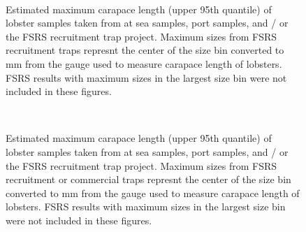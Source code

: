 \documentclass[11pt]{article}
\newcommand{\D}{.}
\newcommand{\e}{/backup/bio_data/bio.lobster/figures/} %
\begin{document}
\begin{landscape}
\begin{figure}
        \centering
         \\
                    
                    \caption{Estimated maximum carapace length (upper 95th quantile) of lobster samples taken from at sea samples, port samples, and / or the FSRS recruitment trap project. Maximum sizes from FSRS recruitment traps represnt the center of the size bin converted to mm from the gauge used to measure carapace length of lobsters. FSRS results with maximum sizes in the largest size bin were not included in these figures.}
        \end{figure}

\begin{figure}
        \centering
         \\
                    
                    \caption{Estimated maximum carapace length (upper 95th quantile) of lobster samples taken from at sea samples, port samples, and / or the FSRS recruitment trap project. Maximum sizes from FSRS recruitment or commercial traps represnt the center of the size bin converted to mm from the gauge used to measure carapace length of lobsters. FSRS results with maximum sizes in the largest size bin were not included in these figures.}
        \end{figure}

\end{landscape}
\end{document}
